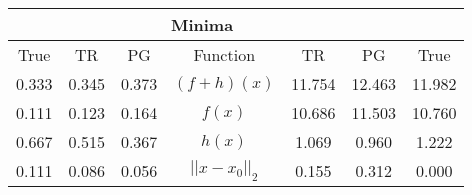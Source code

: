 \begin{tabular}{| c |c |c || c |c |c |c |}
    \hline
    \rowcolor[gray]{0.9}
\multicolumn{3}{|c|}{Parameters} & \multicolumn{4}{|c|}{Minima}\\ \hline True & TR & PG  & Function & TR & PG & True \\
    \hline
  \rowcolor[gray]{0.7}
  0.333 & 0.345 & 0.373   & $ (f + h)(x) $ & 11.754 & 12.463 & 11.982 \\
  \rowcolor[gray]{0.8}
  0.111 & 0.123 & 0.164   & $ f(x) $ & 10.686 & 11.503 & 10.760 \\
  \rowcolor[gray]{0.7}
  0.667 & 0.515 & 0.367   & $ h(x) $ & 1.069 & 0.960 & 1.222 \\
  \rowcolor[gray]{0.8}
  0.111 & 0.086 & 0.056   & $ ||x - x_0||_2 $ & 0.155 & 0.312 & 0.000 \\
\end{tabular}
